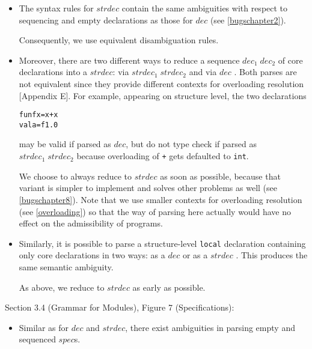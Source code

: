 \documentclass[twoside,titlepage]{article}
\begin{document}
\begin{appendix}
\begin{itemize}
\item The syntax rules for $\mathit{strdec}$ contain the same ambiguities with respect to sequencing and empty declarations as those for $\mathit{dec}$ (see \ref{bugschapter2}).

Consequently, we use equivalent disambiguation rules.

\item Moreover, there are two different ways to reduce a sequence $\mathit{dec}_1\;\mathit{dec}_2$ of core declarations into a $\mathit{strdec}$: via $\mathit{strdec}_1\;\mathit{strdec}_2$ and via $\mathit{dec}$ \cite{mistakes}. Both parses are not equivalent since they provide different contexts for overloading resolution [Appendix E]. For example, appearing on structure level, the two declarations

\begin{quoting}
\begin{alltt}
fun f x = x + x
val a = f 1.0
\end{alltt}
\end{quoting}

may be valid if parsed as $\mathit{dec}$, but do not type check if parsed as $\mathit{strdec}_1\;\mathit{strdec}_2$ because overloading of {\tt +} gets defaulted to {\tt int}.

We choose to always reduce to $\mathit{strdec}$ as soon as possible, because that variant is simpler to implement and solves other problems as well (see \ref{bugschapter8}). Note that we use smaller contexts for overloading resolution (see \ref{overloading}) so that the way of parsing here actually would have no effect on the admissibility of programs.

\item Similarly, it is possible to parse a structure-level {\tt local} declaration containing only core declarations in two ways: as a $\mathit{dec}$ or as a $\mathit{strdec}$ \cite{mistakes}. This produces the same semantic ambiguity.

As above, we reduce to $\mathit{strdec}$ as early as possible.

\end{itemize}


Section 3.4 (Grammar for Modules), Figure 7 (Specifications):

\begin{itemize}

\item Similar as for $\mathit{dec}$ and $\mathit{strdec}$, there exist ambiguities in parsing empty and sequenced $\mathit{spec}$s.


\end{itemize}
\end{appendix}
\end{document}
